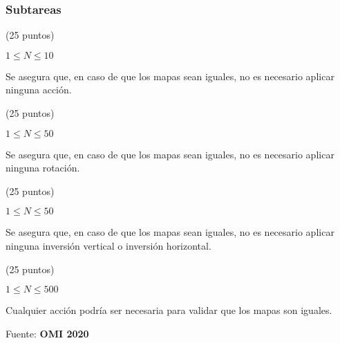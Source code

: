 \subsubsection*{Subtareas}
\begin{plimits}
	\item (25 puntos)
	\begin{plimits}
		\item \(1\leq N \leq 10\)
		\item Se asegura que, en caso de que los mapas sean iguales, no es necesario aplicar ninguna acción.
	\end{plimits}
	\item (25 puntos)
	\begin{plimits}
		\item \(1\leq N \leq 50\)
		\item Se asegura que, en caso de que los mapas sean iguales, no es necesario aplicar ninguna rotación.
	\end{plimits}
	\item (25 puntos)
	\begin{plimits}
		\item \(1\leq N \leq 50\)
		\item Se asegura que, en caso de que los mapas sean iguales, no es necesario aplicar ninguna inversión vertical o inversión horizontal.
	\end{plimits}
	\item (25 puntos)
	\begin{plimits}
		\item \(1\leq N \leq 500\)
		\item Cualquier acción podría ser necesaria para validar que los mapas son iguales.
	\end{plimits}
\end{plimits}
Fuente: \textbf{OMI 2020}

